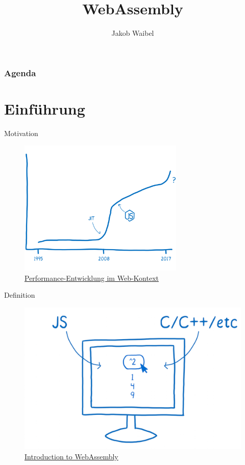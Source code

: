 \documentclass{beamer}
\title[WebAssembly]{WebAssembly}
\author{Jakob Waibel}
\institute[Jakob Waibel]{MI7 Druck und Medien}
\date
\begin{document}
\begin{frame}
    \titlepage
\end{frame}

\begin{frame}
    \frametitle{Agenda}
    \tableofcontents
\end{frame}

\section{Einführung}

\begin{frame}{Motivation}
    \begin{figure}
        \includegraphics[width=0.7\textwidth,height=0.7\textheight]{./images/perf_history.png}
        \caption{\href{https://hacks.mozilla.org/2017/02/a-cartoon-intro-to-webassembly/}{Performance-Entwicklung im Web-Kontext}}
    \end{figure}
\end{frame}

\begin{frame}{Definition}
    \begin{figure}
        \includegraphics[scale=0.2]{./images/definition.png}
        \caption{\href{https://www.smashingmagazine.com/2017/05/abridged-cartoon-introduction-webassembly/}{Introduction to WebAssembly}}
    \end{figure}
\end{frame}
\end{document}
